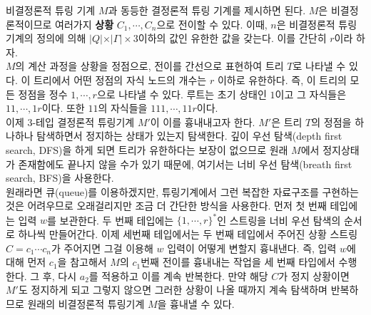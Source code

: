 \documentclass[b5paper]{book}
\theoremstyle{definition}
\newenvironment{pf*}{\pushQED{\qed}\pf}{\popQED\endpf}
\begin{document}
\begin{pf*}
    비결정론적 튜링 기계 $M$과 동등한 결정론적 튜링 기계를 제시하면 된다. 
    $M$은 비결정론적이므로 여러가지 \textbf{상황} $C_1, \cdots, C_n$으로 
    전이할 수 있다. 이때, $n$은 비결정론적 튜링 기계의 정의에 의해 $\vert Q \vert
    \times \vert \Gamma \vert \times 3$이하의 값인 유한한 값을 갖는다. 이를 간단히 $r$이라 하자. \\ 
    $M$의 계산 과정을 상황을 정점으로, 전이를 간선으로 표현하여 트리 $T$로 나타낼 수 있다.
    이 트리에서 어떤 정점의 자식 노드의 개수는 $r$ 이하로 유한하다. 즉, 이 트리의 모든 정점을
    정수 $1, \cdots, r$으로 나타낼 수 있다. 루트는 초기 상태인 $1$이고 그 자식들은
    $11, \cdots, 1r$이다. 또한 $11$의 자식들을 $111, \cdots, 11r$이다. \\
    이제 3-테입 결정론적 튜링기계 $M'$이 이를 흉내내고자 한다. $M'$은 트리 $T$의 정점을
    하나하나 탐색하면서 정지하는 상태가 있는지 탐색한다. 깊이 우선 탐색(depth first search, DFS)을
    하게 되면 트리가 유한하다는 보장이 없으므로 원래 $M$에서 정지상태가 존재함에도 
    끝나지 않을 수가 있기 때문에, 여기서는 너비 우선 탐색(breath first search, BFS)을
    사용한다. \\ 
    원래라면 큐(queue)를 이용하겠지만, 튜링기계에서 그런 복잡한 자료구조를 구현하는 것은
    어려우므로 오래걸리지만 조금 더 간단한 방식을 사용한다. 먼저 첫 번째 테입에는 입력
    $w$를 보관한다. 두 번째 테입에는 $\{1, \cdots, r\}^*$인 스트링을 너비 우선 탐색의
    순서로 하나씩 만들어간다. 이제 세번째 테입에서는 두 번째 테입에서 주어진 상황 스트링 
    $C = c_1 \cdots c_n $가 주어지면 그걸 이용해 $w$ 입력이 어떻게 변할지 흉내낸다. 
    즉, 입력 $w$에 대해 먼저 $c_1$을 참고해서 $M$의 $c_1$번째 전이를 흉내내는 작업을 
    세 번째 타입에서 수행한다. 그 후, 다시 $a_2$를 적용하고 이를 계속 반복한다. 만약
    해당 $C$가 정지 상황이면 $M'$도 정지하게 되고 그렇지 않으면 그러한 상황이 나올 때까지
    계속 탐색하며 반복하므로 원래의 비결정론적 튜링기계 $M$을 흉내낼 수 있다.
\end{pf*}
\end{document}
